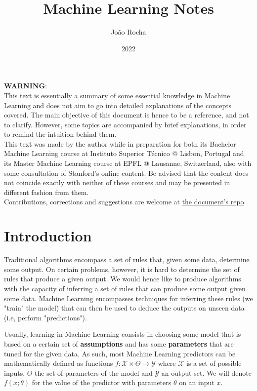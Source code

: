 \documentclass{article}
\title{Machine Learning Notes}
\date{2022}
\author{João Rocha}
\begin{document}
\maketitle
\tableofcontents
\vspace*{\fill}
\textbf{WARNING}:\\ 
This text is essentially a summary of some essential knowledge in Machine Learning and does not aim to go into detailed explanations of the concepts covered.
The main objective of this document is hence to be a reference, and not to clarify.
However, some topics are accompanied by brief explanations, in order to remind the intuition behind them.\\
This text was made by the author while in preparation for both its Bachelor Machine Learning course at Instituto Superior Técnico @ Lisbon, Portugal and its Master Machine Learning course at EPFL @ Lausanne, Switzerland, also with some consultation of Stanford's online content.
Be advised that the content does not coincide exactly with neither of these courses and may be presented in different fashion from them.\\
Contributions, corrections and suggestions are welcome at \href{https://github.com/Calhau18/Machine_Learning_Notes}{the document's repo}.
\newpage

\section{Introduction}

Traditional algorithms encompass a set of rules that, given some data, determine some output.
On certain problems, however, it is hard to determine the set of rules that produce a given output.
We would hence like to produce algorithms with the capacity of inferring a set of rules that can produce some output given some data.
Machine Learning encompasses techniques for inferring these rules (we "train" the model) that can then be used to deduce the outputs on unseen data (i.e, perform "predictions").

Usually, learning in Machine Learning consists in choosing some model that is based on a certain set of \textbf{assumptions} and has some \textbf{parameters} that are tuned for the given data.
As such, most Machine Learning predictors can be mathematically defined as functions $f : \mathcal{X} \times \Theta \to \mathcal{Y}$ where $\mathcal{X}$ is a set of possible inputs, $\Theta$ the set of parameters of the model and $\mathcal{Y}$ an output set.
We will denote $f(x ; \theta)$ for the value of the predictor with parameters $\theta$ on an input $x$.
\end{document}
